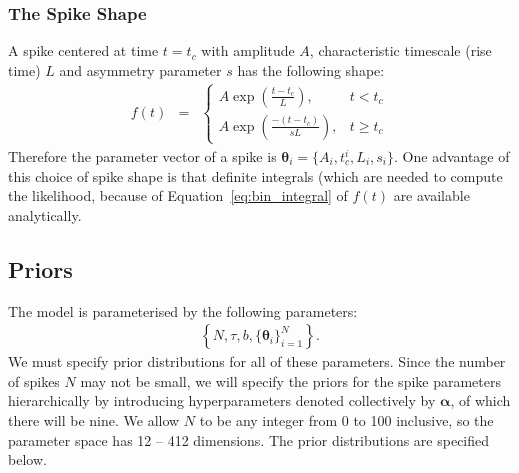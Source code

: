 \documentclass[a4paper, 11pt]{article}
\begin{document}
\subsubsection{The Spike Shape}
A spike centered at time $t=t_c$ with amplitude $A$, characteristic timescale
(rise time) $L$ and asymmetry parameter $s$ has the following shape:
\begin{eqnarray}
f(t) &=& \left\{
\begin{array}{lr}
A\exp\left(\frac{t - t_c}{L}\right), & t < t_c\\
A\exp\left(\frac{-(t - t_c)}{sL}\right), & t \geq t_c
\end{array}
\right.
\end{eqnarray}
Therefore the parameter vector of a spike is
$\boldsymbol{\theta}_i = \{A_i, t_c^i, L_i, s_i\}$. One advantage of this
choice of spike shape is that definite integrals (which are needed to compute
the likelihood, because of Equation~\ref{eq:bin_integral} of $f(t)$ are
available analytically.

\subsection{Priors}
The model is parameterised by the following parameters:
\begin{eqnarray}
\left\{
N, \tau, b, \{\boldsymbol{\theta}_i\}_{i=1}^N
\right\}.
\end{eqnarray}
We must specify prior distributions for all of these parameters. Since the
number of spikes $N$ may not be small, we will specify the priors for the
spike parameters hierarchically by introducing hyperparameters
denoted collectively by $\boldsymbol{\alpha}$, of which there will be nine.
We allow $N$ to be any integer from 0 to 100 inclusive, so
the parameter space has 12 -- 412 dimensions. The prior distributions are
specified below.
\end{document}
